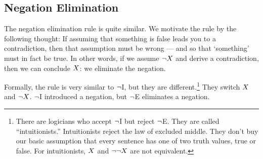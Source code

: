 \subsection{Negation Elimination} 



The negation elimination rule is quite similar.
%
We motivate the rule by the following thought:
If assuming that something is false leads you to a contradiction, then that assumption must be wrong --- and so that `something' must in fact be true. In other words, if we assume $\neg X$ and derive a contradiction, then we can conclude $X$: we eliminate the negation.
\begin{highlighted}\begin{fitchproof}
		\open
		\ellipsesline
		\close
\end{fitchproof}\end{highlighted}
Formally, the rule is very similar to $\neg$I, but they are different.\footnote{There are logicians who accept $\neg$I but reject $\neg$E. They are called ``intuitionists.'' Intuitionists reject the law of excluded middle. They don't buy our basic assumption that every sentence has one of two truth values, true or false. For intuitionists, $X$ and $\neg\neg X$ are not equivalent. 
} They switch $X$ and $\neg X$. 
$\neg$I introduced a negation, but $\neg$E eliminates a negation.

